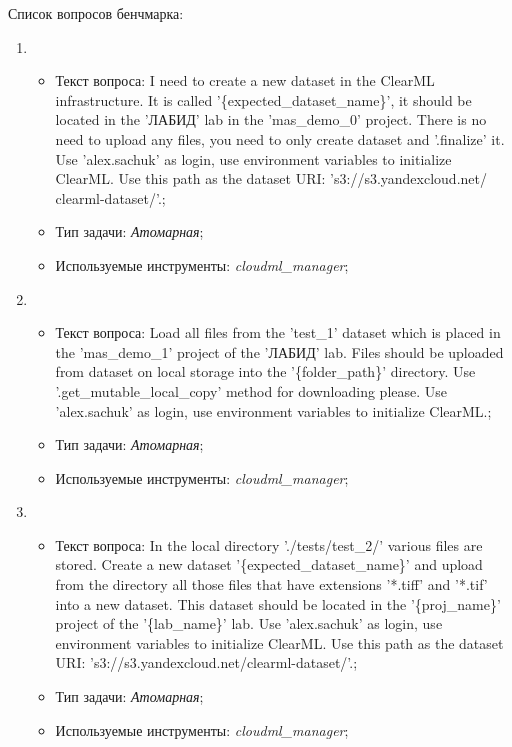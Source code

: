 Список вопросов бенчмарка:
\begin{enumerate}
	\item \begin{itemize}
		\item Текст вопроса: I need to create a new dataset in the ClearML infrastructure.
It is called '\{expected\_dataset\_name\}', it should be located in the 
'ЛАБИД' lab in the 'mas\_demo\_0' project.
There is no need to upload any files, you need to only create dataset and '.finalize\(\)' it.
Use 'alex.sachuk' as login, use environment variables to initialize ClearML.
Use this path as the dataset URI: 's3://s3.yandexcloud.net/ clearml-dataset/'.;
		\item Тип задачи: \textit{Атомарная};
		\item Используемые инструменты: \textit{cloudml\_manager};
	\end{itemize}

	\item \begin{itemize}
		\item Текст вопроса: Load all files from the 'test\_1' dataset which is placed in 
the 'mas\_demo\_1' project of the 'ЛАБИД' lab.
Files should be uploaded from dataset on local storage into the '\{folder\_path\}' directory.
Use '.get\_mutable\_local\_copy\(\)' method for downloading please.
Use 'alex.sachuk' as login, use environment variables to initialize ClearML.;
		\item Тип задачи: \textit{Атомарная};
		\item Используемые инструменты: \textit{cloudml\_manager};
	\end{itemize}

	\item \begin{itemize}
		\item Текст вопроса: In the local directory './tests/test\_2/' various files are stored.
Create a new dataset '\{expected\_dataset\_name\}' and upload from the 
directory all those files that have extensions '*.tiff' and '*.tif' into a new dataset.
This dataset should be located in the '\{proj\_name\}' project of the '\{lab\_name\}' lab. 
Use 'alex.sachuk' as login, use environment variables to initialize ClearML.
Use this path as the dataset URI: 's3://s3.yandexcloud.net/clearml-dataset/'.;
		\item Тип задачи: \textit{Атомарная};
		\item Используемые инструменты: \textit{cloudml\_manager};
	\end{itemize}


\end{enumerate}
